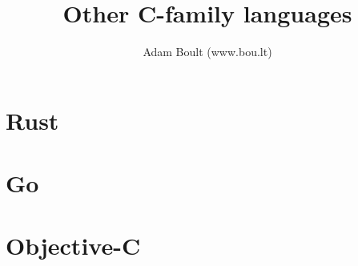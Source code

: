 \documentclass[oneside]{book}
\begin{document}
\author{Adam Boult (www.bou.lt)}
\title{Other C-family languages}
\maketitle

\setcounter{tocdepth}{0}
\tableofcontents



\part{Rust}







\part{Go}

\part{Objective-C}
\end{document}
